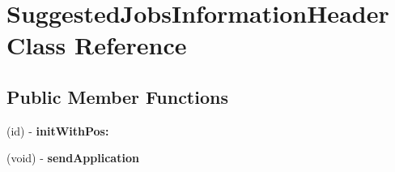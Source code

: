 \hypertarget{interface_suggested_jobs_information_header}{
\section{\-Suggested\-Jobs\-Information\-Header \-Class \-Reference}
\label{interface_suggested_jobs_information_header}
}
\subsection*{\-Public \-Member \-Functions}
\begin{DoxyCompactItemize}
\item 
\hypertarget{interface_suggested_jobs_information_header_a55f903c62b35dfbce3303a9ebd1592ee}{
(id) -\/ {\bfseries init\-With\-Pos\-:}}
\label{interface_suggested_jobs_information_header_a55f903c62b35dfbce3303a9ebd1592ee}

\item 
\hypertarget{interface_suggested_jobs_information_header_a445ad2b48edc198d6e472880f87d1f4e}{
(void) -\/ {\bfseries send\-Application}}
\label{interface_suggested_jobs_information_header_a445ad2b48edc198d6e472880f87d1f4e}

\end{DoxyCompactItemize}

